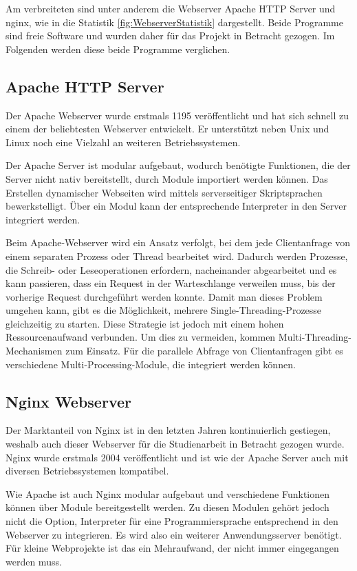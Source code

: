 Am verbreiteten sind unter anderem die Webserver Apache HTTP Server und nginx, wie in die Statistik \ref{fig:WebserverStatistik} dargestellt. Beide Programme sind freie Software und wurden daher für das Projekt in Betracht gezogen. Im Folgenden werden diese beide Programme verglichen.


\subsection{Apache HTTP Server}
Der Apache Webserver wurde erstmals 1195 veröffentlicht und hat sich schnell zu einem der beliebtesten Webserver entwickelt. Er unterstützt neben Unix und Linux noch eine Vielzahl an weiteren Betriebssystemen.

Der Apache Server ist modular aufgebaut, wodurch benötigte Funktionen, die der Server nicht nativ bereitstellt, durch Module importiert werden können. Das Erstellen dynamischer Webseiten wird mittels serverseitiger Skriptsprachen bewerkstelligt. Über ein Modul kann der entsprechende Interpreter in den Server integriert werden.

Beim Apache-Webserver wird ein Ansatz verfolgt, bei dem jede Clientanfrage von einem separaten Prozess oder Thread bearbeitet wird. Dadurch werden Prozesse, die Schreib- oder Leseoperationen erfordern, nacheinander abgearbeitet und es kann passieren, dass ein Request in der Warteschlange verweilen muss, bis der vorherige Request durchgeführt werden konnte. Damit man dieses Problem umgehen kann, gibt es die Möglichkeit, mehrere Single-Threading-Prozesse gleichzeitig zu starten. Diese Strategie ist jedoch mit einem hohen Ressourcenaufwand verbunden. Um dies zu vermeiden, kommen Multi-Threading-Mechanismen zum Einsatz. Für die parallele Abfrage von Clientanfragen gibt es verschiedene Multi-Processing-Module, die integriert werden können.



\subsection{Nginx Webserver}
Der Marktanteil von Nginx ist in den letzten Jahren kontinuierlich gestiegen, weshalb auch dieser Webserver für die Studienarbeit in Betracht gezogen wurde. Nginx wurde erstmals 2004 veröffentlicht und ist wie der Apache Server auch mit diversen Betriebssystemen kompatibel.

Wie Apache ist auch Nginx modular aufgebaut und verschiedene Funktionen können über Module bereitgestellt werden. Zu diesen Modulen gehört jedoch nicht die Option, Interpreter für eine Programmiersprache entsprechend in den Webserver zu integrieren. Es wird also ein weiterer Anwendungsserver benötigt. Für kleine Webprojekte ist das ein Mehraufwand, der nicht immer eingegangen werden muss. 

